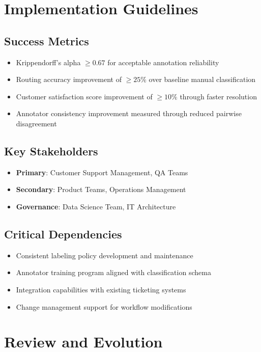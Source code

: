 \documentclass[11pt]{article}
\begin{document}
\section{Implementation Guidelines}

\subsection{Success Metrics}
\begin{itemize}
\item Krippendorff's alpha $\geq 0.67$ for acceptable annotation reliability
\item Routing accuracy improvement of $\geq 25\%$ over baseline manual classification
\item Customer satisfaction score improvement of $\geq 10\%$ through faster resolution
\item Annotator consistency improvement measured through reduced pairwise disagreement
\end{itemize}

\subsection{Key Stakeholders}
\begin{itemize}
\item \textbf{Primary}: Customer Support Management, QA Teams
\item \textbf{Secondary}: Product Teams, Operations Management  
\item \textbf{Governance}: Data Science Team, IT Architecture
\end{itemize}

\subsection{Critical Dependencies}
\begin{itemize}
\item Consistent labeling policy development and maintenance
\item Annotator training program aligned with classification schema
\item Integration capabilities with existing ticketing systems
\item Change management support for workflow modifications
\end{itemize}

\section{Review and Evolution}
\end{document}
